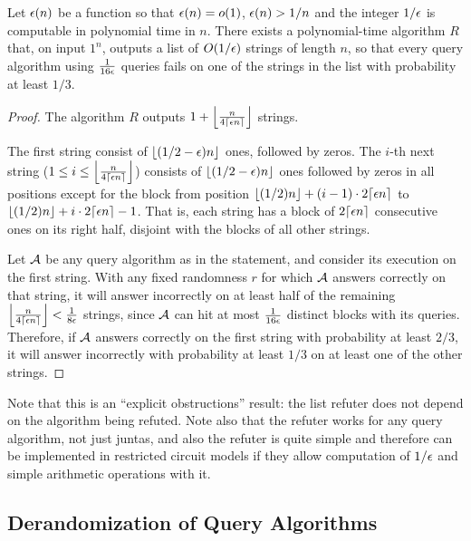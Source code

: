 \begin{theorem}
    \label{thm:refuterlessqueries}
Let $\epsilon(n)$ be a function so that $\epsilon(n) = o(1)$, $\epsilon(n) > 1/n$ and
 the integer $1/\epsilon$ is computable in polynomial time in $n$. 
There exists a polynomial-time 
algorithm $R$ that, on input $1^n$,
outputs a list of $O(1/\epsilon)$ strings of length $n$, 
so that every query algorithm using $\frac{1}{16\epsilon}$ queries
fails on one of the strings in the list with probability at least $1/3$.
\end{theorem}
\begin{proof}
The algorithm $R$ outputs $1 + \left\lfloor \frac{n}{4 \lceil \epsilon n \rceil}\right\rfloor$ strings.

The first string consist of $\lfloor (1/2 - \epsilon)n \rfloor$ ones, followed by zeros. 
The $i$-th next string ($1 \leq i \leq \left\lfloor\frac{n}{4 \lceil \epsilon n \rceil}\right\rfloor$)
consists of $\lfloor (1/2-\epsilon)n \rfloor$ ones followed by zeros in all positions except for 
the block from position
$\lfloor (1/2)n \rfloor +  (i-1) \cdot 2 \lceil \epsilon n \rceil$ to 
$\lfloor (1/2)n \rfloor +  i \cdot 2 \lceil \epsilon n \rceil - 1$.
That is, each string has a block of $2\lceil \epsilon n \rceil$ consecutive ones on its right half,
disjoint with the blocks of all other strings. 

Let $\mathcal{A}$ be any query algorithm as in the statement, and consider its execution on the first string.
With any fixed randomness $r$ for which $\mathcal{A}$ answers correctly on that string, 
it will answer incorrectly on at least half of the remaining 
$\left\lfloor \frac{n}{4 \lceil \epsilon n \rceil}\right\rfloor < \frac{1}{8\epsilon}$ strings,
since $\mathcal{A}$ can hit at most $\frac{1}{16\epsilon}$ distinct blocks with its queries.
Therefore, if $\mathcal{A}$ answers correctly on the first string with probability at least $2/3$, 
it will answer incorrectly with probability at least $1/3$ on at least one of the other strings.  

\end{proof}

Note that this is an ``explicit obstructions'' result: the list refuter does not depend on the algorithm being refuted. 
Note also that the refuter works for any query algorithm, not just juntas, and also
the refuter is quite simple and therefore can be implemented in restricted circuit models if
they allow computation of $1/\epsilon$ and simple arithmetic operations with it. 

\subsection{Derandomization of Query Algorithms}


